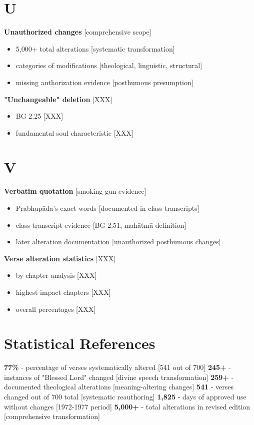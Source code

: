 \documentclass[11pt,twoside]{book}
\begin{document}
\section*{U}
\label{sec:orga85f469}

\textbf{\textbf{Unauthorized changes}} {[}comprehensive scope]
\begin{itemize}
\item 5,000+ total alterations [systematic transformation]
\item categories of modifications [theological, linguistic, structural]
\item missing authorization evidence [posthumous presumption]
\end{itemize}

\textbf{\textbf{"Unchangeable" deletion}} {[}XXX]
\begin{itemize}
\item BG 2.25 [XXX]
\item fundamental soul characteristic [XXX]
\end{itemize}
\section*{V}
\label{sec:orgc26e319}

\textbf{\textbf{Verbatim quotation}} {[}smoking gun evidence]
\begin{itemize}
\item Prabhupāda's exact words [documented in class transcripts]
\item class transcript evidence [BG 2.51, mahātmā definition]
\item later alteration documentation [unauthorized posthumous changes]
\end{itemize}

\textbf{\textbf{Verse alteration statistics}} {[}XXX]
\begin{itemize}
\item by chapter analysis [XXX]
\item highest impact chapters [XXX]
\item overall percentages [XXX]
\end{itemize}
\section*{Statistical References}
\label{sec:orgf2b1d20}

\textbf{\textbf{77\%}} - percentage of verses systematically altered [541 out of 700]
\textbf{\textbf{245+}} - instances of "Blessed Lord" changed [divine speech transformation]
\textbf{\textbf{259+}} - documented theological alterations [meaning-altering changes]
\textbf{\textbf{541}} - verses changed out of 700 total [systematic reauthoring]
\textbf{\textbf{1,825}} - days of approved use without changes [1972-1977 period]
\textbf{\textbf{5,000+}} - total alterations in revised edition [comprehensive transformation]
\end{document}
